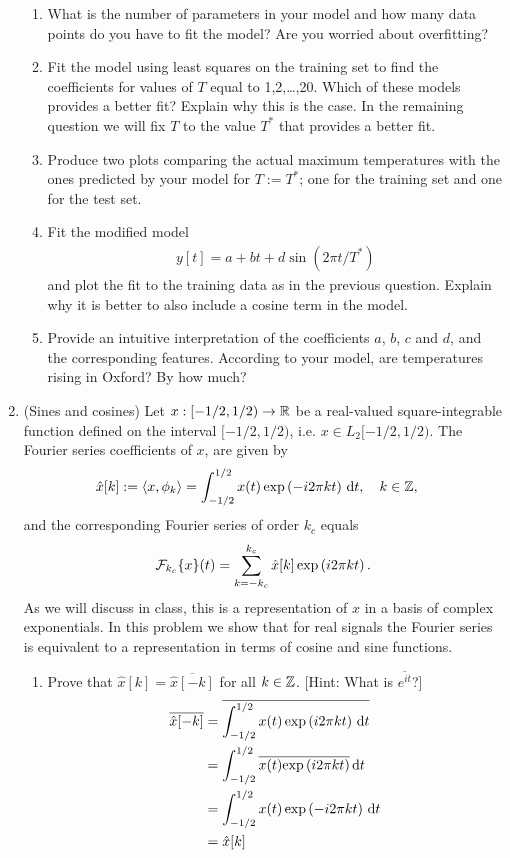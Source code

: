 \documentclass[12pt,twoside]{article}
\begin{document}
\begin{enumerate}
  \begin{enumerate}
  \item What is the number of parameters in your model and how many data points do you have to fit the model? Are you worried about overfitting?
  \item Fit the model using least squares on the training set to
    find the coefficients for values of $T$ equal to 1,2,\ldots,20. Which of these models provides a better fit? Explain why this is the case. In the remaining question we will fix $T$ to the value $T^{\ast}$ that provides a better fit.
  \item Produce two plots comparing the actual maximum temperatures with
    the ones predicted by your model for $T:=T^{\ast}$; one for the training set and one for the test set. 
 \item Fit the modified model  
   \begin{align}
  y[t] = a + bt + d \sin(2\pi t/T^{\ast})
  \end{align}
and plot the fit to the training data as in the previous question. Explain why it is better to also include a cosine term in the model.
   \item Provide an intuitive interpretation of the coefficients $a$, $b$, $c$ and $d$, and the corresponding features. According to your model, are temperatures rising in Oxford? By how much?
  \end{enumerate}
   
 \item (Sines and cosines)
  Let $x:[-1/2,1/2)\to\mathbb{R} $ be a real-valued square-integrable function defined on the interval $[-1/2,1/2)$, i.e. $x\in L_2[-1/2,1/2)$. The Fourier series coefficients of $x$, are given by
\begin{align}
\hat{x}[k] & :=  \left \langle x, \phi_k\right \rangle = \int_{-1/2}^{1/2} x(t) \exp \left( - i2 \pi k t \right)  \, \text{d}t, \quad k \in \mathbb{Z},
\end{align}
and the corresponding Fourier series of order $k_c$ equals
\begin{align}
\mathcal{ F }_{k_c}\{x\}(t) = \sum_{k=-k_c}^{k_c} \hat{x}[k] \exp \left( i 2 \pi k t \right).
\end{align}
As we will discuss in class, this is a representation of $x$ in a basis of complex exponentials. In this problem we show that for real signals the Fourier series is equivalent to a representation in terms of cosine and sine functions.
  \begin{enumerate}
  \item Prove that $\hat{x}[k]=\overline{\hat{x}[-k]}$
    for all $k\in\mathbb{Z}$. [Hint: What is $\overline{e^{it}}$?]\\
    \begin{align*}
    	\overline{\hat{x}[-k]} 	&= 	\overline{  \int_{-1/2}^{1/2} x(t) \exp \left(  i 2 \pi k t \right)  \, \text{d}t } \\
					&=	 \int_{-1/2}^{1/2} \overline{x(t)} \overline{ \exp \left(  i2 \pi k t \right) } \, \text{d}t \\
					&=	 \int_{-1/2}^{1/2} x(t)  \exp \left(  -i 2 \pi k t \right) \, \text{d}t \\
					&= 	 \hat{x}[k] \\
    \end{align*}
    

\end{enumerate}
\end{enumerate}
\end{document}
